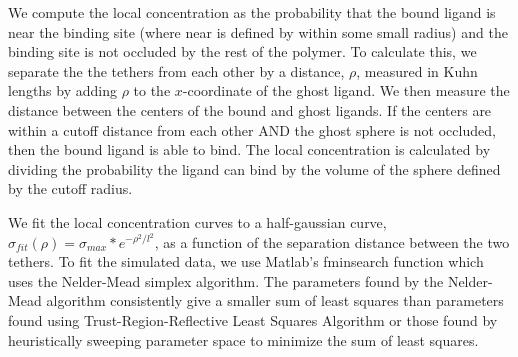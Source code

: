 \documentclass[../../AdvancementSummary.tex]{subfiles}
\begin{document}
We compute the local concentration as the probability that the bound ligand is near the binding site (where near is defined by within some small radius) and the binding site is not occluded by the rest of the polymer. To calculate this, we separate the the tethers from each other by a distance, $\rho$, measured in Kuhn lengths by adding $\rho$ to the $x$-coordinate of the ghost ligand. We then measure the distance between the centers of the bound and ghost ligands. If the centers are within a cutoff distance from each other AND the ghost sphere is not occluded, then the bound ligand is able to bind. The local concentration is calculated by dividing the probability the ligand can bind by the volume of the sphere defined by the cutoff radius.


We fit the local concentration curves to a half-gaussian curve, $\sigma_{fit}(\rho) = \sigma_{max}*e^{-\rho^2/l^2}$, as a function of the separation distance between the two tethers. To fit the simulated data, we use Matlab's fminsearch function which uses the Nelder-Mead simplex algorithm. The parameters found by the Nelder-Mead algorithm consistently give a smaller sum of least squares than parameters found using Trust-Region-Reflective Least Squares Algorithm or those found by heuristically sweeping parameter space to minimize the sum of least squares.
\end{document}
